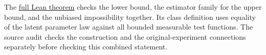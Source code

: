 The \href{https://github.com/davidiach/adaptive-threshold-estimation/blob/8e42a99a49dcd4af8bdaaf17a6ea1c398f34b03b/lean/ThresholdHC/SmoothDensity/Full.lean}{full Lean theorem}
checks the lower bound, the estimator family for the upper bound, and
the unbiased impossibility together. Its class definition uses equality
of the latent parameter law against all bounded measurable test functions.
The source audit checks the construction and the original-experiment
connections separately before checking this combined statement.
